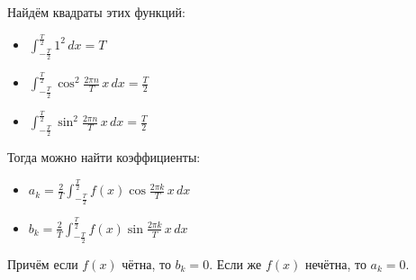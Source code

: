 Найдём квадраты этих функций:
\begin{itemize}
	\item $\displaystyle \int_{-\frac{T}2}^{\frac{T}2} 1^2\,dx = T$
	\item $\displaystyle \int_{-\frac{T}2}^{\frac{T}2} \cos^2 \frac{2 \pi n}T\,x\,dx = \frac{T}2$
	\item $\displaystyle \int_{-\frac{T}2}^{\frac{T}2} \sin^2 \frac{2 \pi n}T\,x\,dx = \frac{T}2$
\end{itemize}

Тогда можно найти коэффициенты:
\begin{itemize}
	\item $\displaystyle a_k = \frac2T \int_{-\frac{T}2}^{\frac{T}2} f(x) \cos \frac{2 \pi k}T\,x\,dx$
	\item $\displaystyle b_k = \frac2T \int_{-\frac{T}2}^{\frac{T}2} f(x) \sin \frac{2 \pi k}T\,x\,dx$
\end{itemize}

Причём если $f(x)$ чётна, то $b_k = 0$.
Если же $f(x)$ нечётна, то $a_k = 0$.